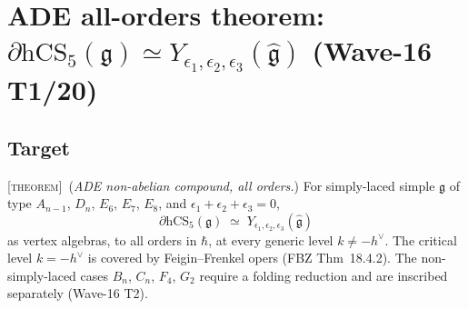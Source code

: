 
\providecommand{\ClaimStatusTheorem}{\textsc{[theorem]}}
\providecommand{\ClaimStatusConjectured}{\textsc{[conjectural]}}
\providecommand{\ClaimStatusDefinition}{\textsc{[definition]}}
\providecommand{\kch}{\kappa_{\mathrm{ch}}}
\providecommand{\kcat}{\kappa_{\mathrm{cat}}}
\providecommand{\kBKM}{\kappa_{\mathrm{BKM}}}
\providecommand{\hCS}{\mathrm{hCS}}
\providecommand{\HH}{\mathrm{HH}}
\providecommand{\CE}{\mathrm{CE}}
\providecommand{\Yaff}{Y_{\epsilon_1,\epsilon_2,\epsilon_3}}
\providecommand{\ghhat}{\widehat{\mathfrak{g}}}
\providecommand{\klev}{k}
\providecommand{\Vvac}{V^{\mathrm{vac}}_{\klev}(\ghhat)}
\providecommand{\C}{\mathbb{C}}
\providecommand{\R}{\mathbb{R}}
\providecommand{\cO}{\mathcal{O}}
\providecommand{\so}{\mathfrak{so}}
\providecommand{\gtwo}{\mathfrak{g}_2}
\providecommand{\ffour}{\mathfrak{f}_4}
\providecommand{\esix}{\mathfrak{e}_6}
\providecommand{\eseven}{\mathfrak{e}_7}
\providecommand{\eeight}{\mathfrak{e}_8}
\providecommand{\gfrak}{\mathfrak{g}}
\providecommand{\hcheck}{h^{\vee}}

\section{ADE all-orders theorem: $\partial\hCS_5(\gfrak)\simeq
  \Yaff(\ghhat)$ (Wave-16 T1/20)}
\label{wn:sec:wave16-t1-ADE}

\subsection{Target}

\ClaimStatusTheorem\ (\emph{ADE non-abelian compound, all orders.})
For simply-laced simple $\gfrak$ of type $A_{n-1}$, $D_n$, $E_6$,
$E_7$, $E_8$, and $\epsilon_1+\epsilon_2+\epsilon_3=0$,
\[
  \partial\hCS_5(\gfrak)\;\simeq\;\Yaff(\ghhat)
\]
as vertex algebras, to all orders in $\hbar$, at every generic level
$\klev\ne-\hcheck$. The critical level $\klev=-\hcheck$ is covered
by Feigin--Frenkel opers (FBZ Thm~18.4.2). The non-simply-laced
cases $B_n$, $C_n$, $F_4$, $G_2$ require a folding reduction and are
inscribed separately (Wave-16 T2).


